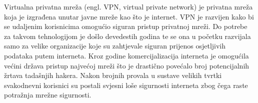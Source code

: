 \begin{article}
	Virtualna privatna mreža (engl. VPN, virtual private network) je privatna mreža koja je izgrađena unutar javne mreže kao što je internet. VPN je razvijen kako bi se udaljenim korisnicima omogućio siguran pristup privatnoj mreži. Do potrebe za takvom tehnologijom je došlo devedestih godina te se ona u početku razvijala samo za velike organizacije koje su zahtjevale siguran prijenos osjetljivih podataka putem interneta. Kroz godine komercijalizacija interneta je omogućila većini država pristup najvećoj mreži što je drastično povećalo broj potencijalnih žrtava tadašnjih hakera. Nakon brojnih provala u sustave velikih tvrtki svakodnevni korisnici su postali svjesni loše sigurnosti interneta zbog čega raste potražnja mrežne sigurnosti.

\end{article}
